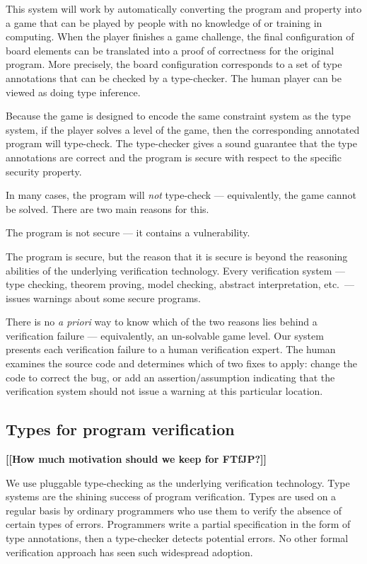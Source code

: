 \documentclass[preprint]{sig-alternate}
\newcommand{\todo}[1]{{\color{red}\bfseries [[#1]]}}
\let\Enumerate =\enumerate
\def\Nospacing{\itemsep=0pt\topsep=0pt\partopsep=0pt\parskip=0pt\parsep=0pt}
\renewenvironment{enumerate}{\Enumerate\Nospacing}{\endlist}
\begin{document}
This system will work by automatically converting the program and
property into a game that can be played by people with no knowledge of
or training in computing.  When the player finishes a game challenge,
the final configuration of board elements can be translated into a
proof of correctness for the original program.  More precisely, the
board configuration corresponds to a set of type annotations that can
be checked by a type-checker.  The human player can be viewed as doing
type inference.

Because the game is designed to encode the same constraint system as
the type system, if the player solves a level of the game, then the
corresponding annotated program will type-check.  The type-checker
gives a sound guarantee that the type annotations are correct and the
program is secure with respect to the specific security property.

In many cases, the program will \emph{not} type-check ---
equivalently, the game cannot be solved.  There are two main reasons
for this.

\begin{enumerate}
\item
  The program is not secure --- it contains a vulnerability.
\item
  The program is secure, but the reason that it is secure is beyond
  the reasoning abilities of the underlying verification technology.
  Every verification system --- type checking, theorem proving, model
  checking, abstract interpretation, etc.\ --- issues warnings about
  some secure programs.
\end{enumerate}

\noindent
There is no \emph{a priori} way to know which of the two reasons lies
behind a verification failure --- equivalently, an un-solvable game
level.  Our system presents each verification failure to a human
verification expert.  The human examines the source code and
determines which of two fixes to apply: change the code to correct the
bug, or add an assertion/assumption indicating that the verification
system should not issue a warning at this particular location.


\subsection{Types for program verification}

\todo{How much motivation should we keep for FTfJP?}

We use pluggable type-checking as the underlying verification
technology.  Type systems are the shining success of program
verification.  Types are used on a regular basis by ordinary
programmers who use them to verify the absence of certain types of
errors.  Programmers write a partial specification in the form of type
annotations, then a type-checker detects potential errors.  No other
formal verification approach has seen such widespread adoption.
\end{document}
